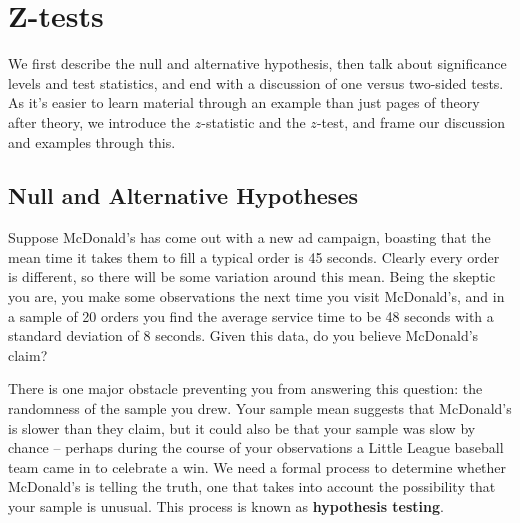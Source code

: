 \section{Z-tests} \label{sec:Z-tests}


We first describe the null and alternative hypothesis, then talk about significance levels and test statistics, and end with a discussion of one versus two-sided tests. As it's easier to learn material through an example than just pages of theory after theory, we introduce the $z$-statistic and the $z$-test, and frame our discussion and examples through this.


\subsection{Null and Alternative Hypotheses}

Suppose McDonald's has come out with a new ad campaign, boasting that the mean time it takes them to fill a typical order is 45 seconds. Clearly every order is different, so there will be some variation around this mean. Being the skeptic you are, you make some observations the next time you visit McDonald's, and in a sample of 20 orders you find the average service time to be 48 seconds with a standard deviation of 8 seconds. Given this data, do you believe McDonald's claim?

There is one major obstacle preventing you from answering this question: the randomness of the sample you drew. Your sample mean suggests that McDonald's is slower than they claim, but it could also be that your sample was slow by chance -- perhaps during the course of your observations a Little League baseball team came in to celebrate a win. We need a formal process to determine whether McDonald's is telling the truth, one that takes into account the possibility that your sample is unusual. This process is known as \textbf{hypothesis testing}.

